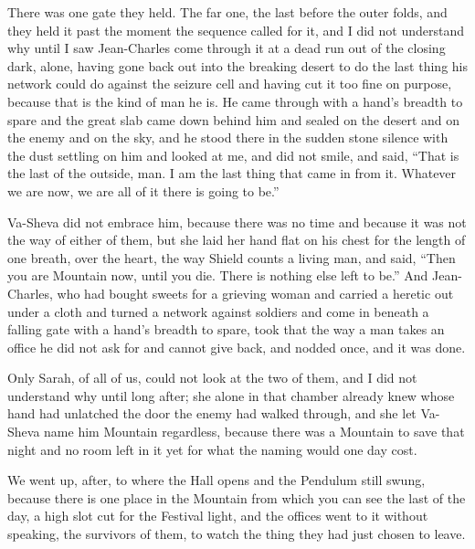 There was one gate they held. The far one, the last before the outer folds, and they held it past the moment the sequence called for it, and I did not understand why until I saw Jean-Charles come through it at a dead run out of the closing dark, alone, having gone back out into the breaking desert to do the last thing his network could do against the seizure cell and having cut it too fine on purpose, because that is the kind of man he is. He came through with a hand's breadth to spare and the great slab came down behind him and sealed on the desert and on the enemy and on the sky, and he stood there in the sudden stone silence with the dust settling on him and looked at me, and did not smile, and said, ``That is the last of the outside, man. I am the last thing that came in from it. Whatever we are now, we are all of it there is going to be.''\par

Va-Sheva did not embrace him, because there was no time and because it was not the way of either of them, but she laid her hand flat on his chest for the length of one breath, over the heart, the way Shield counts a living man, and said, ``Then you are Mountain now, until you die. There is nothing else left to be.'' And Jean-Charles, who had bought sweets for a grieving woman and carried a heretic out under a cloth and turned a network against soldiers and come in beneath a falling gate with a hand's breadth to spare, took that the way a man takes an office he did not ask for and cannot give back, and nodded once, and it was done.\par

Only Sarah, of all of us, could not look at the two of them, and I did not understand why until long after; she alone in that chamber already knew whose hand had unlatched the door the enemy had walked through, and she let Va-Sheva name him Mountain regardless, because there was a Mountain to save that night and no room left in it yet for what the naming would one day cost.\par

\ornament

We went up, after, to where the Hall opens and the Pendulum still swung, because there is one place in the Mountain from which you can see the last of the day, a high slot cut for the Festival light, and the offices went to it without speaking, the survivors of them, to watch the thing they had just chosen to leave.\par

